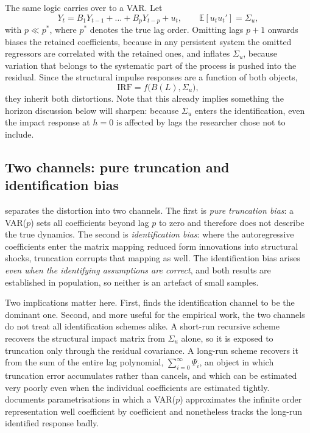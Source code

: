 The same logic carries over to a VAR. Let
\begin{equation}
    Y_t = B_1 Y_{t-1} + \dots + B_p Y_{t-p} + u_t,
    \qquad \mathbb{E}[u_t u_t'] = \Sigma_u ,
    \label{eq:var}
\end{equation}
with $p \ll p^{*}$, where $p^{*}$ denotes the true lag order. Omitting lags $p+1$ onwards
biases the retained coefficients, because in any persistent system the omitted regressors are
correlated with the retained ones, and inflates $\Sigma_u$, because variation that belongs to
the systematic part of the process is pushed into the residual. Since the structural impulse
responses are a function of both objects,
\begin{equation}
    \mathrm{IRF} = f\bigl(B(L), \Sigma_u\bigr),
    \label{eq:irf_f}
\end{equation}
they inherit both distortions. Note that this already implies something the horizon
discussion below will sharpen: because $\Sigma_u$ enters the identification, even the impact
response at $h=0$ is affected by lags the researcher chose not to include.

\subsection{Two channels: pure truncation and identification bias}

\citet{Ravenna2007} separates the distortion into two channels. The first is \emph{pure
truncation bias}: a VAR($p$) sets all coefficients beyond lag $p$ to zero and therefore does
not describe the true dynamics. The second is \emph{identification bias}: where the
autoregressive coefficients enter the matrix mapping reduced form innovations into structural
shocks, truncation corrupts that mapping as well. The identification bias arises \emph{even
when the identifying assumptions are correct}, and both results are established in population,
so neither is an artefact of small samples.

Two implications matter here. First, \citet{Ravenna2007} finds the identification channel to be
the dominant one. Second, and more useful for the empirical work, the two channels do not treat
all identification schemes alike. A short-run recursive scheme recovers the structural impact
matrix from $\Sigma_u$ alone, so it is exposed to truncation only through the residual
covariance. A long-run scheme recovers it from the sum of the entire lag polynomial,
$\sum_{i=0}^{\infty}\Psi_i$, an object in which truncation error accumulates rather than
cancels, and which can be estimated very poorly even when the individual coefficients are
estimated tightly. \citet{Ravenna2007} documents parametrisations in which a VAR($p$)
approximates the infinite order representation well coefficient by coefficient and nonetheless
tracks the long-run identified response badly.

